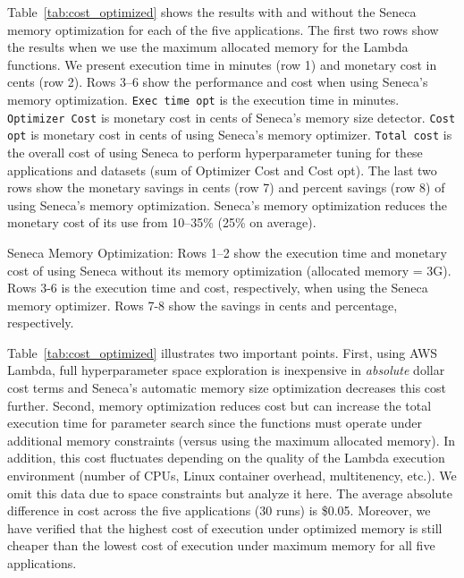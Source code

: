 Table~\ref{tab:cost_optimized} shows the results with and without
the Seneca memory optimization for each of the five applications.
The first two rows show the results when we use the maximum allocated memory 
for the Lambda functions. We present execution time in minutes (row 1) and 
monetary cost in cents (row 2). 
Rows 3--6 show the performance and cost when using Seneca's memory optimization.
\texttt{Exec time opt} is the execution time in minutes.
\texttt{Optimizer Cost} is monetary cost in cents of Seneca's memory size detector.
\texttt{Cost opt} is monetary cost in cents of using Seneca's memory optimizer.
\texttt{Total cost} is the overall cost of using Seneca to perform hyperparameter 
tuning for these applications and datasets (sum of Optimizer Cost and Cost opt).
The last two rows show the monetary savings in cents (row 7) and percent savings (row 8)
of using Seneca's memory optimization.  Seneca's memory optimization reduces
the monetary cost of its use from 10--35\% (25\% on average).


\begin{table}
\centering

\caption{Seneca Memory Optimization: Rows 1--2 show the execution time and  monetary cost 
of using Seneca without its memory optimization (allocated memory = 3G). 
Rows 3-6 is the execution time and cost, 
respectively, when using the Seneca memory optimizer. 
Rows 7-8 show the savings in cents and percentage, respectively.
\label{tab:cost_optimized}}
\end{table}

Table~\ref{tab:cost_optimized} illustrates two important points.
First, using AWS Lambda, full hyperparameter space exploration is inexpensive in
\textit{absolute} dollar cost terms and Seneca's automatic memory size optimization
decreases this cost further.  Second, memory optimization reduces cost but can 
increase the total execution time for parameter search 
since the functions must operate under additional memory 
constraints (versus using the maximum allocated memory).  
In addition, this cost fluctuates depending on the quality of the Lambda
execution environment (number of CPUs, Linux container overhead, 
multitenency, etc.).  We omit this data due to space constraints but analyze it here.
The average absolute difference in cost
across the five applications (30 runs) is \$0.05. %
Moreover, we have verified that the highest cost of execution under 
optimized memory is still cheaper than the lowest cost of execution under maximum 
memory for all five applications.

